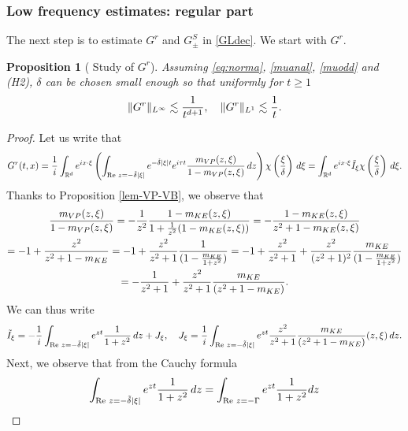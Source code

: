 \documentclass[11pt]{amsart}
\numberwithin{equation}{section}
\newtheorem{prop}{Proposition}[section]
\begin{document}
  \subsubsection{Low frequency estimates: regular part}

 The next step is to estimate $G^r$ and $G^S_{\pm}$ in \eqref{GLdec}. We start with $G^r$. 

 \begin{prop}[ Study of $G^r$]
 \label{propGr}
 Assuming \eqref{eq:norma}, \eqref{muanal}, \eqref{muodd} and (H2), $\delta$ can be chosen small enough so that 
     uniformly for $t \geq 1$
    $$ \| G^r \|_{L^\infty} \lesssim {1 \over t^{d+1}}, \quad   \| G^r \|_{L^1} \lesssim {1 \over t }.$$
 
 \end{prop}
 
 
 \begin{proof}
 Let us write that 
$$ G^r(t,x) =  \frac{1}{i} \int_{\mathbb{R}^d} e^{ix \cdot \xi} \left( \int_{\operatorname{Re}\, z = - \tilde \delta  | \xi| }  e^{- \tilde \delta | \xi | t }  e^{i \tau t }{ m_{VP}(z ,\xi) \over 1-m_{VP}(z, \xi)}\, dz \right) \chi \left( { \xi \over \delta} \right)  \, d\xi
 =   \int_{\mathbb{R}^d} e^{ix \cdot \xi}  \tilde{I}_{\xi}  \chi \left( { \xi \over \delta} \right)  \, d\xi.
$$
Thanks to  Proposition \ref{lem-VP-VB},  we observe that
 \begin{multline*} { m_{VP} (z, \xi)  \over 1 - m_{VP}(z,\xi)} = - { 1 \over z^2} { 1 - m_{KE}(z, \xi) \over  1 + { 1 \over z^2}( 1- m_{KE}(z,\xi))}
  =  - {1 -  m_{KE}(z, \xi)  \over z^2  + 1 - m_{KE}(z, \xi) } \\
   = - 1 +  { z^2 \over z^2+ 1 - m_{KE}} = - 1 + { z^2 \over z^2 + 1 } { 1 \over (1 - {m_{KE}\over 1+ z^2})}
    = - 1 + { z^2 \over z^2 + 1 }  + { z^2 \over( z^2 + 1)^2 } { m_{KE} \over (1 - {m_{KE}\over 1+ z^2}) } \\
     = - { 1 \over z^2 + 1} + {z^2 \over z^2+1}   { m_{KE} \over (z^2+ 1 - m_{KE}) }.
  \end{multline*}
   We can thus write
   $$ \tilde{I}_{\xi}= -{1 \over i } \int_{\operatorname{Re}\, z = - \tilde \delta | \xi| } e^{ zt } { 1 \over  1+ z^2}\, dz +  J_{\xi}, \quad J_{\xi}=
   { 1 \over i } \int_{\operatorname{Re}\, z = - \tilde \delta  | \xi| }e^{zt}   {z^2 \over z^2+1}   { m_{KE} \over (z^2+ 1 - m_{KE})}(z, \xi)\, dz.$$
    Next, we observe that from the Cauchy formula
    $$  \int_{\operatorname{Re}\, z = - \tilde \delta | \xi| } e^{ zt } { 1 \over  1+ z^2} \, dz
     =  \int_{\operatorname{Re}\, z = - \Gamma } e^{ zt } { 1 \over  1+ z^2}dz $$

\end{proof}
\end{document}
